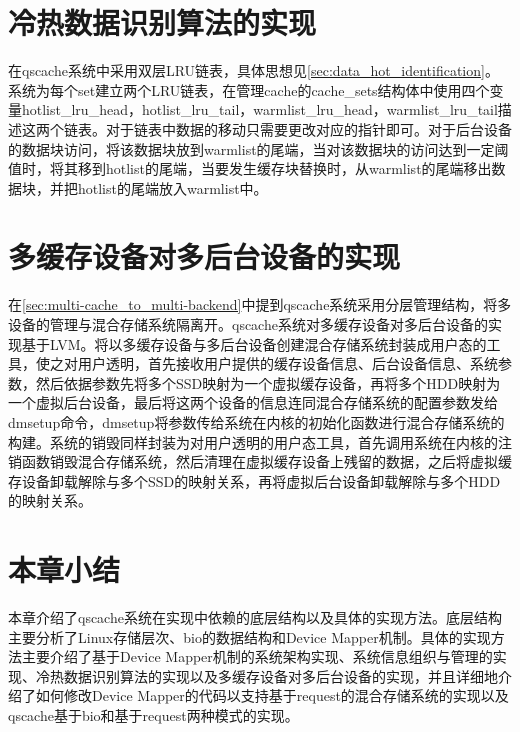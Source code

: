 \section{冷热数据识别算法的实现}

在qscache系统中采用双层LRU链表，具体思想见\ref{sec:data_hot_identification}。系统为每个set建立两个LRU链表，在管理cache的cache\_sets结构体中使用四个变量hotlist\_lru\_head，hotlist\_lru\_tail，warmlist\_lru\_head，warmlist\_lru\_tail描述这两个链表。对于链表中数据的移动只需要更改对应的指针即可。对于后台设备的数据块访问，将该数据块放到warmlist的尾端，当对该数据块的访问达到一定阈值时，将其移到hotlist的尾端，当要发生缓存块替换时，从warmlist的尾端移出数据块，并把hotlist的尾端放入warmlist中。

\section{多缓存设备对多后台设备的实现}

在\ref{sec:multi-cache_to_multi-backend}中提到qscache系统采用分层管理结构，将多设备的管理与混合存储系统隔离开。qscache系统对多缓存设备对多后台设备的实现基于LVM。将以多缓存设备与多后台设备创建混合存储系统封装成用户态的工具，使之对用户透明，首先接收用户提供的缓存设备信息、后台设备信息、系统参数，然后依据参数先将多个SSD映射为一个虚拟缓存设备，再将多个HDD映射为一个虚拟后台设备，最后将这两个设备的信息连同混合存储系统的配置参数发给dmsetup命令，dmsetup将参数传给系统在内核的初始化函数进行混合存储系统的构建。系统的销毁同样封装为对用户透明的用户态工具，首先调用系统在内核的注销函数销毁混合存储系统，然后清理在虚拟缓存设备上残留的数据，之后将虚拟缓存设备卸载解除与多个SSD的映射关系，再将虚拟后台设备卸载解除与多个HDD的映射关系。


\section{本章小结}
本章介绍了qscache系统在实现中依赖的底层结构以及具体的实现方法。底层结构主要分析了Linux存储层次、bio的数据结构和Device Mapper机制。具体的实现方法主要介绍了基于Device Mapper机制的系统架构实现、系统信息组织与管理的实现、冷热数据识别算法的实现以及多缓存设备对多后台设备的实现，并且详细地介绍了如何修改Device Mapper的代码以支持基于request的混合存储系统的实现以及qscache基于bio和基于request两种模式的实现。
